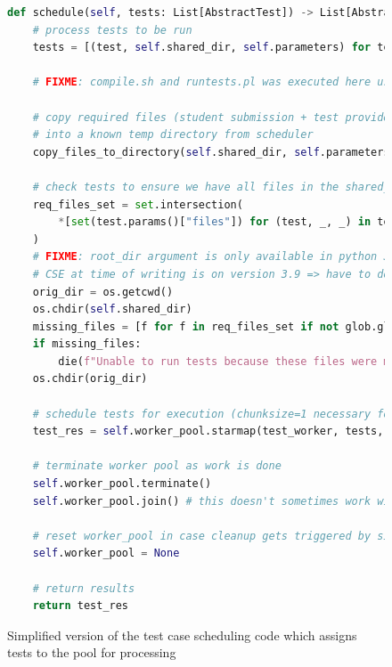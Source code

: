 \documentclass[hidelinks]{report}
\begin{document}
\begin{figure}[h]
	\centering
	\begin{lstlisting}[language=python, breaklines=true, linewidth=\linewidth, tabsize=4]
def schedule(self, tests: List[AbstractTest]) -> List[AbstractTest]:
    # process tests to be run
    tests = [(test, self.shared_dir, self.parameters) for test in tests]

    # FIXME: compile.sh and runtests.pl was executed here usually

    # copy required files (student submission + test provided)
    # into a known temp directory from scheduler
    copy_files_to_directory(self.shared_dir, self.parameters, self.args)

    # check tests to ensure we have all files in the shared_dir to execute tests, otherwise die with missing files
    req_files_set = set.intersection(
        *[set(test.params()["files"]) for (test, _, _) in tests]
    )
    # FIXME: root_dir argument is only available in python 3.10
    # CSE at time of writing is on version 3.9 => have to do things the old fashioned way
    orig_dir = os.getcwd()
    os.chdir(self.shared_dir)
    missing_files = [f for f in req_files_set if not glob.glob(f)]
    if missing_files:
        die(f"Unable to run tests because these files were missing: {' '.join(missing_files)}")
    os.chdir(orig_dir)

    # schedule tests for execution (chunksize=1 necessary for proper containerisation)
    test_res = self.worker_pool.starmap(test_worker, tests, chunksize=1)

    # terminate worker pool as work is done
    self.worker_pool.terminate()
    self.worker_pool.join() # this doesn't sometimes work with .close() so just terminate

    # reset worker_pool in case cleanup gets triggered by signal
    self.worker_pool = None

    # return results
    return test_res
	\end{lstlisting}
	\caption{Simplified version of the test case scheduling code which assigns tests to the pool for processing}
	\label{fig:testSchedulerSchedule}
\end{figure}
\end{document}
